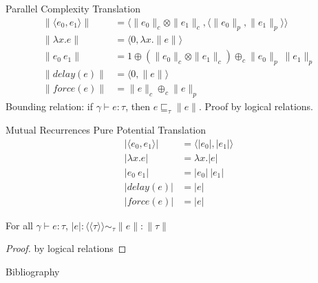 \documentclass[pdf]{beamer}
\newcommand{\LP}{\langle}
\newcommand{\RP}{\rangle}
\newcommand{\LL}{\langle\!\langle}
\newcommand{\RR}{\rangle\!\rangle}
\begin{document}
\begin{frame}{Parallel Complexity Translation}
  \begin{align*}
    \|\LP e_0, e_1 \RP \| &= \LP \|e_0\|_c \otimes \|e_1\|_c, \LP \|e_0\|_p, \|e_1\|_p\RP\RP \\
    \|\lambda x.e\| &= \LP 0, \lambda x.\|e\| \RP \\
    \|e_0\ e_1\| &= 1 \oplus (\|e_0\|_c \otimes \|e_1\|_c) \oplus_c \|e_0\|_p\ \|e_1\|_p \\
    \|delay(e)\| &= \LP 0, \|e\|\RP \\
    \|force(e)\| &= \|e\|_c \oplus_c \|e\|_p
  \end{align*}
  Bounding relation: if $\gamma \vdash e : \tau$, then $e \sqsubseteq_\tau \|e\|$.
  Proof by logical relations.
\end{frame}

\begin{frame}{Mutual Recurrences}
  Pure Potential Translation
    \begin{align*}
      |\LP e_0, e_1 \RP | &= \LP |e_0|, |e_1| \RP                                  \\
      |\lambda x.e | &= \lambda x.|e|                                                              \\
      |e_0\ e_1| &= |e_0|\ |e_1|                                                                   \\
      |delay(e)| &= |e|                                                                            \\
      |force(e)| &= |e|
    \end{align*}
  \begin{theorem}
    For all $\gamma \vdash e : \tau$, $|e| : \LL \tau \RR \sim_\tau \|e\| : \|\tau\|$
  \end{theorem}
  \begin{proof}
    by logical relations
  \end{proof}
\end{frame}


\begin{frame}{Bibliography}
  
  
\end{frame}
\end{document}
